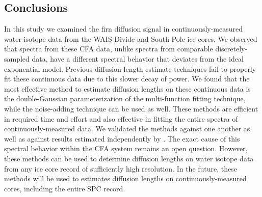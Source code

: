 \documentclass[draft, jgrga]{AGUTeX}
\begin{document}
\begin{article}

\section{Conclusions}

In this study we examined the firn diffusion signal in continuously-measured water-isotope data from the WAIS Divide and South Pole ice cores. We observed that spectra from these CFA data, unlike spectra from comparable discretely-sampled data, have a different spectral behavior that deviates from the ideal exponential model. Previous diffusion-length estimate techniques fail to properly fit these continuous data due to this slower decay of power. We found that the most effective method to estimate diffusion lengths on these continuous data is the double-Gaussian parameterization of the multi-function fitting technique, while the noise-adding technique can be used as well. These methods are efficient in required time and effort and also effective in fitting the entire spectra of continuously-measured data. We validated the methods against one another as well as against results estimated independently by \citet{Jones2017a}. The exact cause of this spectral behavior within the CFA system remains an open question. However, these methods can be used to determine diffusion lengths on water isotope data from any ice core record of sufficiently high resolution. In the future, these methods will be used to estimates diffusion lengths on continuously-measured cores, including the entire SPC record.









\end{article}
\end{document}
